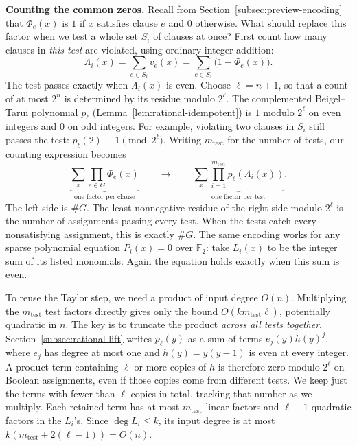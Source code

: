\medskip\noindent
\textbf{Counting the common zeros.}
Recall from Section~\ref{subsec:preview-encoding} that $\Phi_e(x)$ is
$1$ if $x$ satisfies clause $e$ and $0$ otherwise. What should replace
this factor when we test a whole set $S_i$ of clauses at once? First
count how many clauses in \emph{this test} are violated, using ordinary
integer addition:
\[
 \Lambda_i(x)=\sum_{e\in S_i}v_e(x)=\sum_{e\in S_i}\bigl(1-\Phi_e(x)\bigr).
\]
The test passes exactly when $\Lambda_i(x)$ is even. Choose $\ell=n+1$, so
that a count of at most $2^n$ is determined by its residue modulo
$2^\ell$. The complemented Beigel--Tarui polynomial $p_\ell$
(Lemma~\ref{lem:rational-idempotent}) is $1$ modulo $2^\ell$ on even
integers and $0$ on odd integers. For example, violating two clauses
in $S_i$ still passes the test: $p_\ell(2)\equiv1\pmod{2^\ell}$.
Writing $m_{\mathrm{test}}$ for the number of tests, our counting expression becomes
\[
 \underbrace{\sum_x\prod_{e\in G}\Phi_e(x)}_{\text{one factor per clause}}
 \qquad\longrightarrow\qquad
 \underbrace{\sum_x\prod_{i=1}^{m_{\mathrm{test}}} p_\ell(\Lambda_i(x))}_{\text{one factor per test}}.
\]
The left side is $\#G$. The least nonnegative residue of the right
side modulo $2^\ell$ is the number of assignments passing every test.
When the tests catch every nonsatisfying assignment, this is exactly
$\#G$. The same encoding works for
any sparse polynomial equation $P_i(x)=0$ over $\mathbb F_2$: take
$L_i(x)$ to be the integer sum of its listed monomials. Again the
equation holds exactly when this sum is even.

To reuse the Taylor step, we need a product of input degree $O(n)$.
Multiplying the $m_{\mathrm{test}}$ test factors directly gives only the bound
$O(km_{\mathrm{test}}\ell)$, potentially quadratic in $n$. The key is to truncate
the product \emph{across all tests together}. Section~\ref{subsec:rational-lift}
writes $p_\ell(y)$ as a sum of terms $e_j(y)h(y)^j$, where
$e_j$ has degree at most one and $h(y)=y(y-1)$ is even at every
integer. A product term containing $\ell$ or more copies of $h$ is
therefore zero modulo $2^\ell$ on Boolean assignments, even if those
copies come from different tests. We keep just the terms with fewer
than $\ell$ copies in total, tracking that number as we multiply.
Each retained term has at most $m_{\mathrm{test}}$ linear factors and $\ell-1$
quadratic factors in the $L_i$'s. Since $\deg L_i\le k$, its input
degree is at most $k(m_{\mathrm{test}}+2(\ell-1))=O(n)$.

